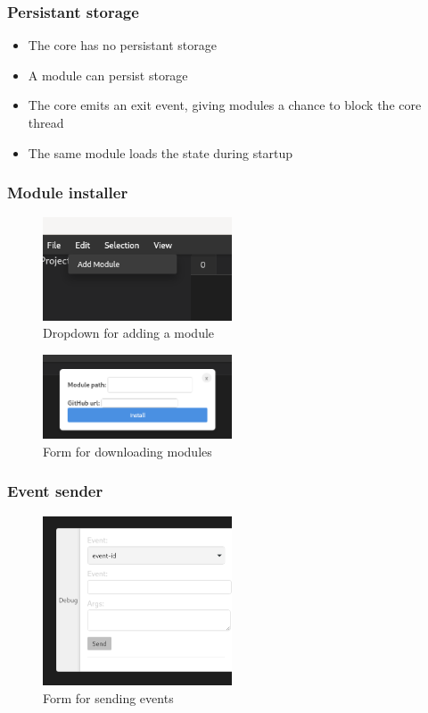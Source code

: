 \begin{frame}
  \frametitle{Persistant storage}
  \begin{itemize}
    \item The core has no persistant storage
    \item A module can persist storage
    \item The core emits an exit event, giving modules a chance to block the
    core thread
    \item The same module loads the state during startup
  \end{itemize}
\end{frame}

\begin{frame}
  \frametitle{Module installer}
  \begin{figure}
    \centering
    \includegraphics[width=0.5\textwidth]{./pics/module-installer-tab.png}
    \caption{
      Dropdown for adding a module
    }
  \end{figure}
  \begin{figure}
    \centering
    \includegraphics[width=0.5\textwidth]{./pics/module-installer.png}
    \caption{
      Form for downloading modules
    }
  \end{figure}
\end{frame}

\begin{frame}
  \frametitle{Event sender}
  \begin{figure}
    \centering
    \includegraphics[width=0.5\textwidth]{./pics/event-mocking.png}
    \caption{
      Form for sending events
    }
  \end{figure}
\end{frame}

